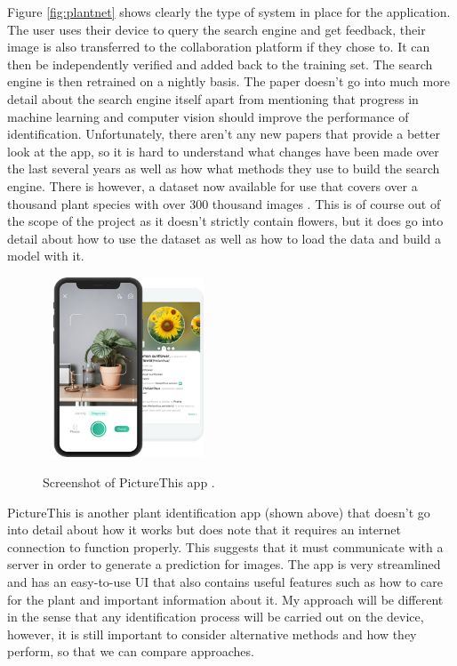 \documentclass[12pt,a4paper]{report}
\begin{document}
Figure \ref{fig:plantnet} shows clearly the type of system in place for the application. The user uses their device to 
query the search
engine and get feedback, their image is also transferred to the collaboration platform if they chose to. It can then be 
independently verified and added back to the training set. The search engine is then retrained on a nightly basis. The 
paper doesn't go into much more detail about the search engine itself apart from mentioning that progress in machine 
learning and computer vision should improve the performance of identification. Unfortunately, there aren't any new 
papers that provide a better look at the app, so it is hard to understand what changes have been made over the last 
several years as well as how what methods they use to build the search engine. There is however, a dataset now 
available for use that covers over a thousand plant species with over 300 thousand images 
\citep{camille_garcin_2021_5645731}. This is of course out of the scope of the project as it doesn't strictly contain 
flowers, but it does go into detail about how to use the dataset as well as how to load the data and build a model with 
it.

\begin{figure}[h]\
    \centering
    \includegraphics[width=0.4\textwidth]{picturethis.png}
    \caption{Screenshot of PictureThis app \citep{picturethis}.}
\end{figure}

\break

PictureThis is another plant identification app (shown above) that doesn't go into detail about how it works but does 
note that it requires an internet connection to function properly. This suggests that it must communicate with a server 
in order to generate a prediction for images. The app is very streamlined and has an easy-to-use UI that also contains 
useful features such as how to care for the plant and important information about it. My approach will be different in 
the sense that any identification process will be carried out on the device, however, it is still important to consider 
alternative methods and how they perform, so that we can compare approaches.
\end{document}
